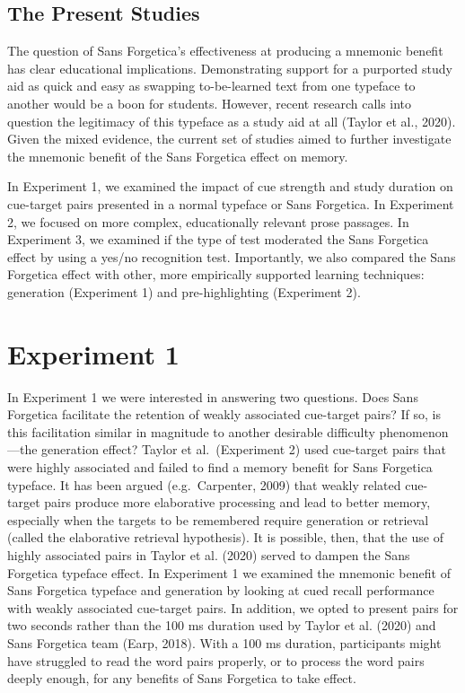 \documentclass[
  english,
  jou]{apa6}
\begin{document}
\hypertarget{the-present-studies}{%
\subsection{The Present Studies}\label{the-present-studies}}

The question of Sans Forgetica's effectiveness at producing a mnemonic benefit has clear educational implications. Demonstrating support for a purported study aid as quick and easy as swapping to-be-learned text from one typeface to another would be a boon for students. However, recent research calls into question the legitimacy of this typeface as a study aid at all (Taylor et al., 2020). Given the mixed evidence, the current set of studies aimed to further investigate the mnemonic benefit of the Sans Forgetica effect on memory.

In Experiment 1, we examined the impact of cue strength and study duration on cue-target pairs presented in a normal typeface or Sans Forgetica. In Experiment 2, we focused on more complex, educationally relevant prose passages. In Experiment 3, we examined if the type of test moderated the Sans Forgetica effect by using a yes/no recognition test. Importantly, we also compared the Sans Forgetica effect with other, more empirically supported learning techniques: generation (Experiment 1) and pre-highlighting (Experiment 2).

\hypertarget{experiment-1}{%
\section{Experiment 1}\label{experiment-1}}

In Experiment 1 we were interested in answering two questions. Does Sans Forgetica facilitate the retention of weakly associated cue-target pairs? If so, is this facilitation similar in magnitude to another desirable difficulty phenomenon---the generation effect? Taylor et al.~(Experiment 2) used cue-target pairs that were highly associated and failed to find a memory benefit for Sans Forgetica typeface. It has been argued (e.g.~Carpenter, 2009) that weakly related cue-target pairs produce more elaborative processing and lead to better memory, especially when the targets to be remembered require generation or retrieval (called the elaborative retrieval hypothesis). It is possible, then, that the use of highly associated pairs in Taylor et al. (2020) served to dampen the Sans Forgetica typeface effect. In Experiment 1 we examined the mnemonic benefit of Sans Forgetica typeface and generation by looking at cued recall performance with weakly associated cue-target pairs. In addition, we opted to present pairs for two seconds rather than the 100 ms duration used by Taylor et al. (2020) and Sans Forgetica team (Earp, 2018). With a 100 ms duration, participants might have struggled to read the word pairs properly, or to process the word pairs deeply enough, for any benefits of Sans Forgetica to take effect.
\end{document}
